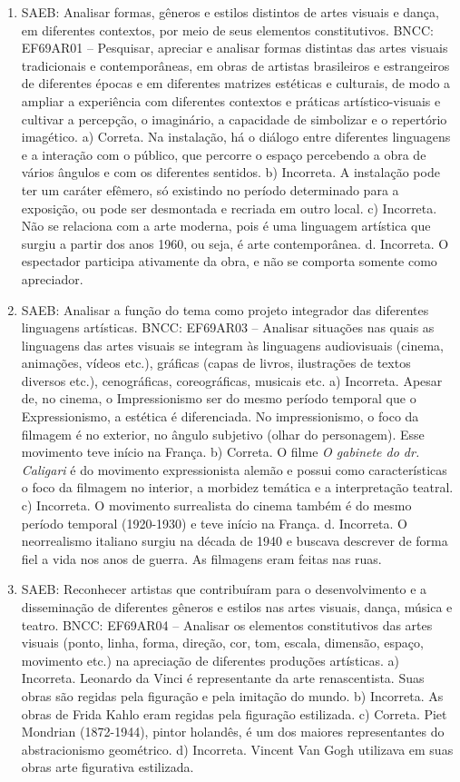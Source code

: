 \begin{enumerate}
\item
SAEB: Analisar formas, gêneros e estilos distintos de artes visuais e
dança, em diferentes contextos, por meio de seus elementos
constitutivos.
BNCC: EF69AR01 -- Pesquisar, apreciar e analisar formas distintas das artes visuais tradicionais e
contemporâneas, em obras de artistas brasileiros e estrangeiros de diferentes épocas e em
diferentes matrizes estéticas e culturais, de modo a ampliar a experiência com diferentes
contextos e práticas artístico-visuais e cultivar a percepção, o imaginário, a capacidade de
simbolizar e o repertório imagético.
a) Correta. Na instalação, há o diálogo entre diferentes linguagens e a
interação com o público, que percorre o espaço percebendo a obra de
vários ângulos e com os diferentes sentidos.
b) Incorreta. A instalação pode ter um caráter efêmero, só existindo no
período determinado para a exposição, ou pode ser desmontada e recriada
em outro local.
c) Incorreta. Não se relaciona com a arte moderna, pois é uma linguagem
artística que surgiu a partir dos anos 1960, ou seja, é arte
contemporânea.
d. Incorreta. O espectador participa ativamente da obra, e não se
comporta somente como apreciador.

\item
SAEB: Analisar a função do tema como projeto integrador das diferentes
linguagens artísticas.
BNCC: EF69AR03 -- Analisar situações nas quais as linguagens das artes visuais se integram às
linguagens audiovisuais (cinema, animações, vídeos etc.), gráficas (capas de livros, ilustrações
de textos diversos etc.), cenográficas, coreográficas, musicais etc.
a) Incorreta. Apesar de, no cinema, o Impressionismo ser do mesmo período temporal que o Expressionismo,
a estética é diferenciada. No impressionismo, o foco da filmagem é no
exterior, no ângulo subjetivo (olhar do personagem). Esse movimento teve
início na França.
b) Correta. O filme \emph{O gabinete do dr. Caligari} é do movimento
expressionista alemão e possui como características o foco da filmagem
no interior, a morbidez temática e a interpretação teatral.
c) Incorreta. O movimento surrealista do cinema também é do mesmo
período temporal (1920-1930) e teve início na França.
d. Incorreta. O neorrealismo italiano surgiu na década de 1940 e buscava
descrever de forma fiel a vida nos anos de guerra. As filmagens eram
feitas nas ruas.

\item
SAEB: Reconhecer artistas que contribuíram para o desenvolvimento e a
disseminação de diferentes gêneros e estilos nas artes visuais, dança,
música e teatro.
BNCC: EF69AR04 -- Analisar os elementos constitutivos das artes visuais (ponto, linha, forma, direção,
cor, tom, escala, dimensão, espaço, movimento etc.) na apreciação de diferentes produções
artísticas.
a) Incorreta. Leonardo da Vinci é representante da arte renascentista.
Suas obras são regidas pela figuração e pela imitação do mundo.
b) Incorreta. As obras de Frida Kahlo eram regidas pela figuração
estilizada.
c) Correta. Piet Mondrian (1872-1944), pintor holandês, é um dos maiores
representantes do abstracionismo geométrico.
d) Incorreta. Vincent Van Gogh utilizava em suas obras arte figurativa
estilizada.
\end{enumerate}

